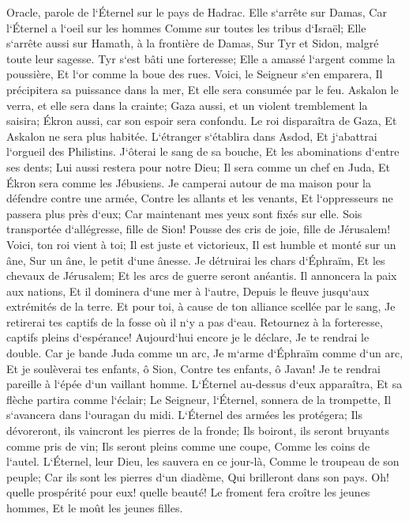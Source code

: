 \verse Oracle, parole de l`Éternel sur le pays de Hadrac. Elle s`arrête sur Damas, Car l`Éternel a l`oeil sur les hommes Comme sur toutes les tribus d`Israël; 
\verse Elle s`arrête aussi sur Hamath, à la frontière de Damas, Sur Tyr et Sidon, malgré toute leur sagesse. 
\verse Tyr s`est bâti une forteresse; Elle a amassé l`argent comme la poussière, Et l`or comme la boue des rues. 
\verse Voici, le Seigneur s`en emparera, Il précipitera sa puissance dans la mer, Et elle sera consumée par le feu. 
\verse Askalon le verra, et elle sera dans la crainte; Gaza aussi, et un violent tremblement la saisira; Ékron aussi, car son espoir sera confondu. Le roi disparaîtra de Gaza, Et Askalon ne sera plus habitée. 
\verse L`étranger s`établira dans Asdod, Et j`abattrai l`orgueil des Philistins. 
\verse J`ôterai le sang de sa bouche, Et les abominations d`entre ses dents; Lui aussi restera pour notre Dieu; Il sera comme un chef en Juda, Et Ékron sera comme les Jébusiens. 
\verse Je camperai autour de ma maison pour la défendre contre une armée, Contre les allants et les venants, Et l`oppresseurs ne passera plus près d`eux; Car maintenant mes yeux sont fixés sur elle. 
\verse Sois transportée d`allégresse, fille de Sion! Pousse des cris de joie, fille de Jérusalem! Voici, ton roi vient à toi; Il est juste et victorieux, Il est humble et monté sur un âne, Sur un âne, le petit d`une ânesse. 
\verse Je détruirai les chars d`Éphraïm, Et les chevaux de Jérusalem; Et les arcs de guerre seront anéantis. Il annoncera la paix aux nations, Et il dominera d`une mer à l`autre, Depuis le fleuve jusqu`aux extrémités de la terre. 
\verse Et pour toi, à cause de ton alliance scellée par le sang, Je retirerai tes captifs de la fosse où il n`y a pas d`eau. 
\verse Retournez à la forteresse, captifs pleins d`espérance! Aujourd`hui encore je le déclare, Je te rendrai le double. 
\verse Car je bande Juda comme un arc, Je m`arme d`Éphraïm comme d`un arc, Et je soulèverai tes enfants, ô Sion, Contre tes enfants, ô Javan! Je te rendrai pareille à l`épée d`un vaillant homme. 
\verse L`Éternel au-dessus d`eux apparaîtra, Et sa flèche partira comme l`éclair; Le Seigneur, l`Éternel, sonnera de la trompette, Il s`avancera dans l`ouragan du midi. 
\verse L`Éternel des armées les protégera; Ils dévoreront, ils vaincront les pierres de la fronde; Ils boiront, ils seront bruyants comme pris de vin; Ils seront pleins comme une coupe, Comme les coins de l`autel. 
\verse L`Éternel, leur Dieu, les sauvera en ce jour-là, Comme le troupeau de son peuple; Car ils sont les pierres d`un diadème, Qui brilleront dans son pays. 
\verse Oh! quelle prospérité pour eux! quelle beauté! Le froment fera croître les jeunes hommes, Et le moût les jeunes filles. 

